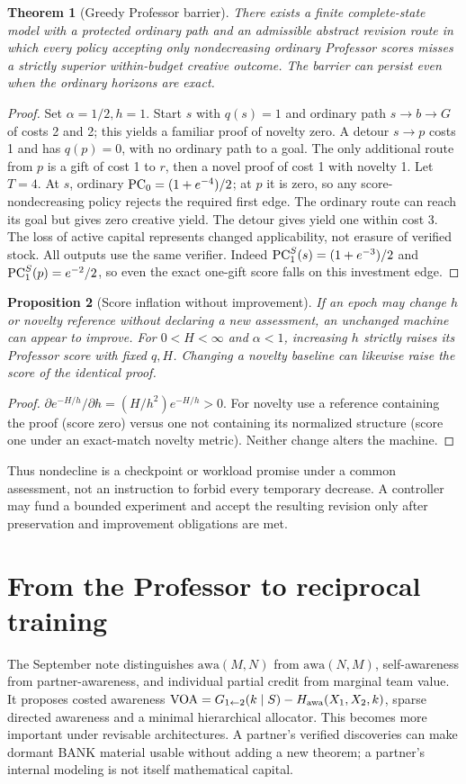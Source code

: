 \documentclass[11pt]{article}
\newtheorem{theorem}{Theorem}[section]\newtheorem{proposition}[theorem]{Proposition}\newtheorem{lemma}[theorem]{Lemma}\newtheorem{corollary}[theorem]{Corollary}
\theoremstyle{definition}\newtheorem{definition}[theorem]{Definition}\newtheorem{conjecture}[theorem]{Conjecture}\newtheorem{example}[theorem]{Example}
\begin{document}
\begin{theorem}[Greedy Professor barrier]
There exists a finite complete-state model with a protected ordinary path and an admissible abstract revision route in which every policy accepting only nondecreasing ordinary Professor scores misses a strictly superior within-budget creative outcome. The barrier can persist even when the ordinary horizons are exact.
\end{theorem}
\begin{proof}Set $\alpha=1/2,h=1$. Start $s$ with $q(s)=1$ and ordinary path $s\to b\to G$ of costs 2 and 2; this yields a familiar proof of novelty zero. A detour $s\to p$ costs 1 and has $q(p)=0$, with no ordinary path to a goal. The only additional route from $p$ is a gift of cost 1 to $r$, then a novel proof of cost 1 with novelty 1. Let $T=4$. At $s$, ordinary $\operatorname{PC}_0=(1+e^{-4})/2$; at $p$ it is zero, so any score-nondecreasing policy rejects the required first edge. The ordinary route can reach its goal but gives zero creative yield. The detour gives yield one within cost 3. The loss of active capital represents changed applicability, not erasure of verified stock. All outputs use the same verifier. Indeed $\operatorname{PC}_1^S(s)=(1+e^{-3})/2$ and $\operatorname{PC}_1^S(p)=e^{-2}/2$, so even the exact one-gift score falls on this investment edge.\end{proof}
\begin{proposition}[Score inflation without improvement]
If an epoch may change $h$ or novelty reference without declaring a new assessment, an unchanged machine can appear to improve. For $0<H<\infty$ and $\alpha<1$, increasing $h$ strictly raises its Professor score with fixed $q,H$. Changing a novelty baseline can likewise raise the score of the identical proof.
\end{proposition}
\begin{proof}$\partial e^{-H/h}/\partial h=(H/h^2)e^{-H/h}>0$. For novelty use a reference containing the proof (score zero) versus one not containing its normalized structure (score one under an exact-match novelty metric). Neither change alters the machine.\end{proof}
Thus nondecline is a checkpoint or workload promise under a common assessment, not an instruction to forbid every temporary decrease. A controller may fund a bounded experiment and accept the resulting revision only after preservation and improvement obligations are met.

\section{From the Professor to reciprocal training}
The September note distinguishes $\mathrm{awa}(M,N)$ from $\mathrm{awa}(N,M)$, self-awareness from partner-awareness, and individual partial credit from marginal team value. It proposes costed awareness $\mathrm{VOA}=G_{1\leftarrow2}(k\mid S)-H_{\rm awa}(X_1,X_2,k)$, sparse directed awareness and a minimal hierarchical allocator. This becomes more important under revisable architectures. A partner's verified discoveries can make dormant BANK material usable without adding a new theorem; a partner's internal modeling is not itself mathematical capital.
\end{document}
